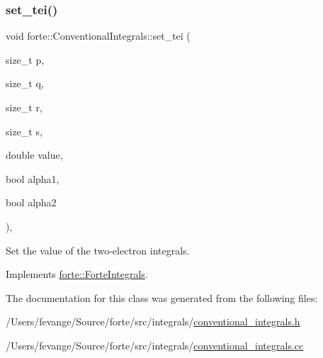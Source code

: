 \subsubsection{\texorpdfstring{set\+\_\+tei()}{set\_tei()}}
{\footnotesize\ttfamily void forte\+::\+Conventional\+Integrals\+::set\+\_\+tei (\begin{DoxyParamCaption}\item[{size\+\_\+t}]{p,  }\item[{size\+\_\+t}]{q,  }\item[{size\+\_\+t}]{r,  }\item[{size\+\_\+t}]{s,  }\item[{double}]{value,  }\item[{bool}]{alpha1,  }\item[{bool}]{alpha2 }\end{DoxyParamCaption})\hspace{0.3cm}{\ttfamily [override]}, {\ttfamily [virtual]}}



Set the value of the two-\/electron integrals. 



Implements \mbox{\hyperlink{classforte_1_1_forte_integrals_aaccd56e90bbc3c423158efb154336b9c}{forte\+::\+Forte\+Integrals}}.



The documentation for this class was generated from the following files\+:\begin{DoxyCompactItemize}
\item 
/\+Users/fevange/\+Source/forte/src/integrals/\mbox{\hyperlink{conventional__integrals_8h}{conventional\+\_\+integrals.\+h}}\item 
/\+Users/fevange/\+Source/forte/src/integrals/\mbox{\hyperlink{conventional__integrals_8cc}{conventional\+\_\+integrals.\+cc}}\end{DoxyCompactItemize}
